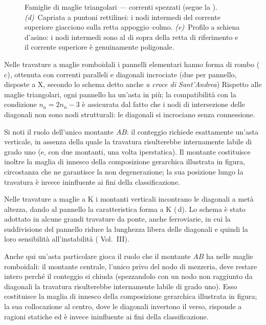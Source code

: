 \begin{figure}[!htbp]
{\begin{tikzpicture}
	\end{tikzpicture}}
	\caption{Famiglie di maglie triangolari --- correnti spezzati
		(segue la ).
		\emph{(d)}~Capriata a puntoni rettilinei: i nodi
		intermedi del corrente superiore giacciono sulla
		retta appoggio--colmo.
		\emph{(e)}~Profilo a schiena d'asino: i nodi
		intermedi sono al di sopra della retta di
		riferimento e il corrente superiore è
		genuinamente poligonale.}
	\label{fig:capriate_spezzato}
\end{figure}


Nelle travature a maglie romboidali i pannelli
elementari hanno forma di rombo
(\,c), ottenuta con
correnti paralleli e diagonali incrociate (due per
pannello, disposte a X, secondo lo schema detto
anche \emph{a croce di Sant'Andrea})
Rispetto alle
maglie triangolari, ogni pannello ha un'asta in più;
la compatibilità con la condizione $n_a = 2n_n - 3$
è assicurata dal fatto che i nodi di intersezione
delle diagonali non sono nodi strutturali: le diagonali
si incrociano senza connessione.

Si noti il ruolo dell'unico montante $AB$: il
conteggio richiede esattamente un'asta verticale,
in assenza della quale la travatura risulterebbe
internamente labile di grado uno (e, con due
montanti, una volta iperstatica). Il montante
costituisce inoltre la maglia di innesco della
composizione gerarchica illustrata in figura,
circostanza che ne garantisce la non degenerazione;
la sua posizione lungo la travatura è invece
ininfluente ai fini della classificazione.

Nelle travature a maglie a K i montanti verticali
incontrano le diagonali a metà altezza, dando al
pannello la caratteristica forma a K
(\,d). Lo schema è
stato adottato in alcune grandi travature da ponte,
anche ferroviarie, in cui la suddivisione del
pannello riduce la lunghezza libera delle diagonali
e quindi la loro sensibilità all'instabilità
( Vol.~III).

Anche qui un'asta particolare gioca il ruolo che
il montante $AB$ ha nelle maglie romboidali: il
montante centrale, l'unico privo del nodo di
mezzeria, deve restare intero perché il conteggio
si chiuda (spezzandolo con un nodo non raggiunto
da diagonali la travatura risulterebbe internamente
labile di grado uno). Esso costituisce la maglia
di innesco della composizione gerarchica illustrata
in figura; la sua collocazione al centro, dove le
diagonali invertono il verso, risponde a ragioni
statiche ed è invece ininfluente ai fini della
classificazione.

